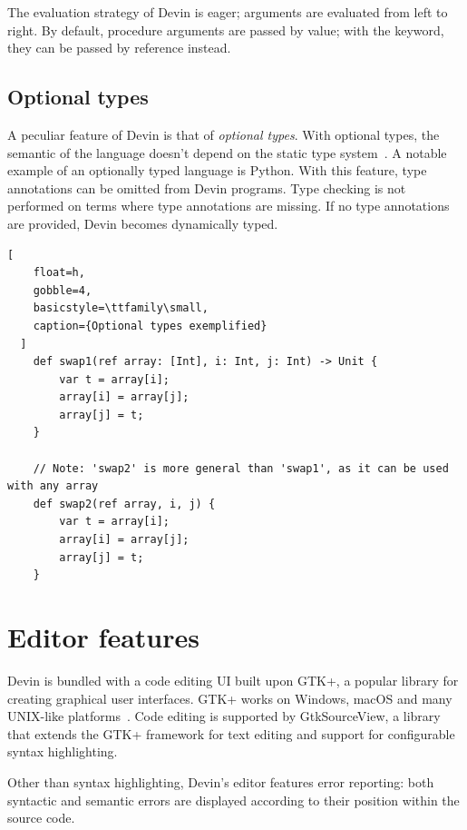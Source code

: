 \documentclass[UdineBachThesis,american,11pt,draft]{PhdThesis}
\begin{document}
  The evaluation strategy of Devin is eager; arguments are evaluated from left
  to right. By default, procedure arguments are passed by value; with the
  \lstinline@ref@ keyword, they can be passed by reference instead.

  \subsection{Optional types}

  A peculiar feature of Devin is that of \emph{optional types}. With optional
  types, the semantic of the language doesn't depend on the static type
  system~\cite{bracha_2004}. A notable example of an optionally typed language
  is Python. With this feature, type annotations can be omitted from Devin
  programs. Type checking is not performed on terms where type annotations are
  missing. If no type annotations are provided, Devin becomes dynamically typed.

  \begin{lstlisting}[
    float=h,
    gobble=4,
    basicstyle=\ttfamily\small,
    caption={Optional types exemplified}
  ]
    def swap1(ref array: [Int], i: Int, j: Int) -> Unit {
        var t = array[i];
        array[i] = array[j];
        array[j] = t;
    }

    // Note: 'swap2' is more general than 'swap1', as it can be used with any array
    def swap2(ref array, i, j) {
        var t = array[i];
        array[i] = array[j];
        array[j] = t;
    }
  \end{lstlisting}

  \section{Editor features}
  \label{section:editorfeatures}

  Devin is bundled with a code editing UI built upon GTK+, a popular library for
  creating graphical user interfaces. GTK+ works on Windows, macOS and many
  UNIX-like platforms~\cite{gtk+}. Code editing is supported by GtkSourceView, a
  library that extends the GTK+ framework for text editing and support for
  configurable syntax highlighting.

  Other than syntax highlighting, Devin's editor features error reporting: both
  syntactic and semantic errors are displayed according to their position within
  the source code.
\end{document}
